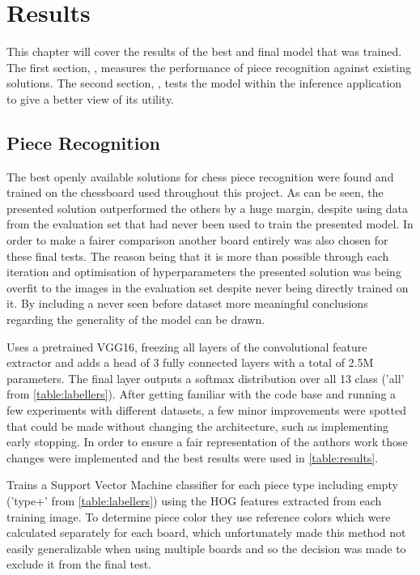 \chapter{Results}
\label{results}

This chapter will cover the results of the best and final model that was trained.  The first section, , measures the performance
of piece recognition against existing solutions.  The second section, , tests the model within the inference application
to give a better view of its utility.

\section{Piece Recognition}
\label{evaluation}

The best openly available solutions for chess piece recognition were found and trained on the chessboard used throughout this project.
As can be seen, the presented solution outperformed the others by a huge margin, despite using data from the evaluation set that had never
been used to train the presented model.  In order to make a fairer comparison another board entirely was also chosen for these final tests.  The 
reason being that it is more than possible through each iteration and optimisation of hyperparameters the presented solution was being overfit to the 
images in the evaluation set despite never being directly trained on it.  By including a never seen before dataset more meaningful conclusions
regarding the generality of the model can be drawn.

\cite{} Uses a pretrained VGG16, freezing all layers of the convolutional feature extractor and adds a head of 3 fully connected layers with a total of 2.5M parameters.
The final layer outputs a softmax distribution over all 13 class ('all' from \autoref{table:labellers}).  After getting familiar with the code base and running a few 
experiments with different datasets, a few minor improvements were spotted that could be made without changing the architecture, such as implementing early stopping. 
In order to ensure a fair representation of the authors work those changes were implemented and the best results were used in \autoref{table:results}.

\cite{} Trains a Support Vector Machine classifier for each piece type including empty ('type+' from \autoref{table:labellers}) using the HOG features extracted 
from each training image.  To determine piece color they use reference colors which were calculated separately for each board, which unfortunately made this method 
not easily generalizable when using multiple boards and so the decision was made to exclude it from the final test.

